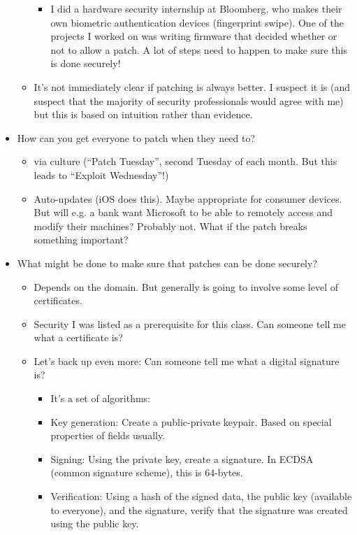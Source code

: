 \documentclass[11pt]{article}
\begin{document}
\begin{itemize}
\begin{itemize}
\begin{itemize}
            \item I did a hardware security internship at Bloomberg, who makes their own biometric authentication devices (fingerprint swipe). One of the projects I worked on was writing firmware that decided whether or not to allow a patch. A lot of steps need to happen to make sure this is done securely!
        \end{itemize}
        \item It's not immediately clear if patching is always better. I suspect it is (and suspect that the majority of security professionals would agree with me) but this is based on intuition rather than evidence. 
    \end{itemize}
    \item How can you get everyone to patch when they need to?
    \begin{itemize}
        \item via culture (``Patch Tuesday'', second Tuesday of each month. But this leads to ``Exploit Wednesday''!)
        \item Auto-updates (iOS does this). Maybe appropriate for consumer devices. But will e.g. a bank want Microsoft to be able to remotely access and modify their machines? Probably not. What if the patch breaks something important?
    \end{itemize}
    \item What might be done to make sure that patches can be done securely?
    \begin{itemize}
        \item Depends on the domain. But generally is going to involve some level of certificates.
        \item Security I was listed as a prerequisite for this class. Can someone tell me what a certificate is?
        \item Let's back up even more: Can someone tell me what a digital signature is?
        \begin{itemize}
            \item It's a set of algorithms:
            \item Key generation: Create a public-private keypair. Based on special properties of fields usually. 
            \item Signing: Using the private key, create a signature. In ECDSA (common signature scheme), this is 64-bytes.
            \item Verification: Using a hash of the signed data, the public key (available to everyone), and the signature, verify that the signature was created using the public key. 

\end{itemize}
\end{itemize}
\end{itemize}
\end{document}
